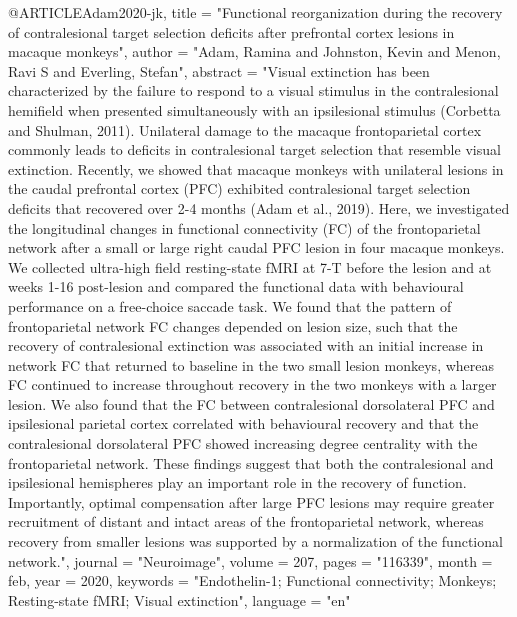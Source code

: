 @ARTICLE{Adam2020-jk,
	title    = "Functional reorganization during the recovery of contralesional
	target selection deficits after prefrontal cortex lesions in
	macaque monkeys",
	author   = "Adam, Ramina and Johnston, Kevin and Menon, Ravi S and Everling,
	Stefan",
	abstract = "Visual extinction has been characterized by the failure to
	respond to a visual stimulus in the contralesional hemifield when
	presented simultaneously with an ipsilesional stimulus (Corbetta
	and Shulman, 2011). Unilateral damage to the macaque
	frontoparietal cortex commonly leads to deficits in
	contralesional target selection that resemble visual extinction.
	Recently, we showed that macaque monkeys with unilateral lesions
	in the caudal prefrontal cortex (PFC) exhibited contralesional
	target selection deficits that recovered over 2-4 months (Adam et
	al., 2019). Here, we investigated the longitudinal changes in
	functional connectivity (FC) of the frontoparietal network after
	a small or large right caudal PFC lesion in four macaque monkeys.
	We collected ultra-high field resting-state fMRI at 7-T before
	the lesion and at weeks 1-16 post-lesion and compared the
	functional data with behavioural performance on a free-choice
	saccade task. We found that the pattern of frontoparietal network
	FC changes depended on lesion size, such that the recovery of
	contralesional extinction was associated with an initial increase
	in network FC that returned to baseline in the two small lesion
	monkeys, whereas FC continued to increase throughout recovery in
	the two monkeys with a larger lesion. We also found that the FC
	between contralesional dorsolateral PFC and ipsilesional parietal
	cortex correlated with behavioural recovery and that the
	contralesional dorsolateral PFC showed increasing degree
	centrality with the frontoparietal network. These findings
	suggest that both the contralesional and ipsilesional hemispheres
	play an important role in the recovery of function. Importantly,
	optimal compensation after large PFC lesions may require greater
	recruitment of distant and intact areas of the frontoparietal
	network, whereas recovery from smaller lesions was supported by a
	normalization of the functional network.",
	journal  = "Neuroimage",
	volume   =  207,
	pages    = "116339",
	month    =  feb,
	year     =  2020,
	keywords = "Endothelin-1; Functional connectivity; Monkeys; Resting-state
	fMRI; Visual extinction",
	language = "en"
}

